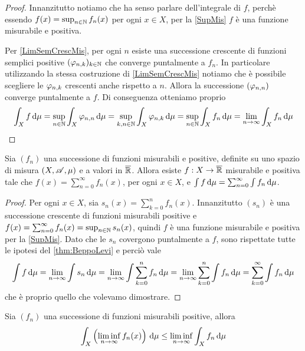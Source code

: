 \begin{proof}
	Innanzitutto notiamo che ha senso parlare dell'integrale di $f$, perchè essendo $f(x)=\sup_{n\in\mathbb N}f_n(x)$ per ogni $x\in X$, per la \cref{SupMis} $f$ è una funzione misurabile e positiva.
	
	Per \cref{LimSemCrescMis}, per ogni $n$ esiste una successione crescente di funzioni semplici positive $(\varphi_{n,k})_{k\in\mathbb N}$ che converge puntalmente a $f_n$. In particolare utilizzando la stessa costruzione di \cref{LimSemCrescMis} notiamo che è possibile scegliere le $\varphi_{n,k}$ crescenti anche rispetto a $n$. Allora la successione $(\varphi_{n,n})$ converge puntalmente a $f$. Di conseguenza otteniamo proprio
	\begin{equation*}
		\int_X f\,\mathrm d\mu=\sup_{n\in\mathbb N}\int_X\varphi_{n,n}\,\mathrm d\mu=\sup_{k,n\in\mathbb N}\int_X \varphi_{n,k}\,\mathrm d\mu=\sup_{n\in\mathbb N}\int_X f_n\,\mathrm d\mu=\lim_{n\to\infty}\int_Xf_n\,\mathrm d\mu
	\end{equation*}
\end{proof}

\begin{corollary}\label{cor:IntegrazionePerSeriePositive}
	Sia $(f_n)$ una successione di funzioni misurabili e positive, definite su uno spazio di misura $(X,\mathscr A,\mu)$ e a valori in $\overline{\mathbb R}$. Allora esiste $f:X\to\overline{\mathbb R}$ misurabile e positiva tale che $f(x)=\sum_{n=0}^\infty f_n(x)$, per ogni $x\in X$, e $\int f\,\mathrm d\mu=\sum_{n=0}^\infty\int f_n\,\mathrm d\mu$.
\end{corollary}

\begin{proof}
	Per ogni $x\in X$, sia $s_n(x)=\sum_{k=0}^nf_n(x)$. Innanzitutto $(s_n)$ è una successione crescente di funzioni misurabili positive e $f(x)=\sum_{n=0}^\infty f_n(x)=\sup_{n\in\mathbb N}s_n(x)$, quindi $f$ è una funzione misurabile e positiva per la \cref{SupMis}. Dato che le $s_n$ covergono puntalmente a $f$, sono rispettate tutte le ipotesi del \cref{thm:BeppoLevi} e perciò vale
	\begin{equation*}
		\int f \,\mathrm d\mu=\lim_{n\to\infty}\int s_n\,\mathrm d\mu=\lim_{n\to\infty}\int \sum_{k=0}^nf_n\,\mathrm d\mu=\lim_{n\to\infty}\sum_{k=0}^n \int f_n\,\mathrm d\mu=\sum_{k=0}^\infty\int f_n\,\mathrm d\mu
	\end{equation*}
	che è proprio quello che volevamo dimostrare.
\end{proof}



\begin{lemma}[Fatou] \label{lem:Fatou}
	Sia $(f_n)$ una successione di funzioni misurabili positive, allora 
	\begin{equation*}
		\int_X\left(\liminf_{n\to\infty}f_n(x)\right)\,\mathrm d\mu\le \liminf_{n\to\infty}\int_Xf_n\,\mathrm d\mu
	\end{equation*}
\end{lemma}

